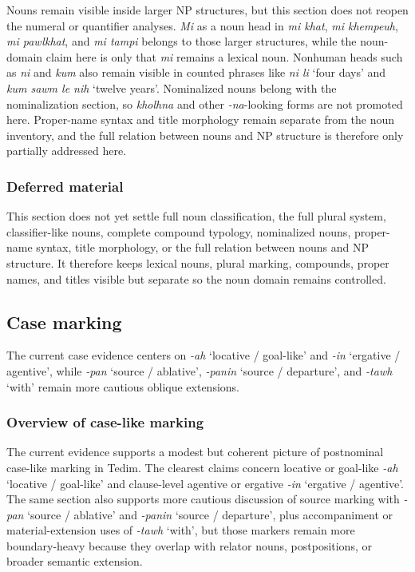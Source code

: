 \documentclass[
  11pt,
  a4paper,
]{article}
\newcommand{\tdim}[1]{\textit{#1}}
\newcommand{\glossquote}[1]{`#1'}
\begin{document}
Nouns remain visible inside larger NP structures, but this section does
not reopen the numeral or quantifier analyses. \tdim{Mi} as a noun head
in \tdim{mi khat}, \tdim{mi khempeuh}, \tdim{mi pawlkhat}, and
\tdim{mi tampi} belongs to those larger structures, while the
noun-domain claim here is only that \tdim{mi} remains a lexical noun.
Nonhuman heads such as \tdim{ni} and \tdim{kum} also remain visible in
counted phrases like \tdim{ni li} \glossquote{four days} and
\tdim{kum sawm le nih} \glossquote{twelve years}. Nominalized nouns
belong with the nominalization section, so \tdim{kholhna} and other
\tdim{-na}-looking forms are not promoted here. Proper-name syntax and
title morphology remain separate from the noun inventory, and the full
relation between nouns and NP structure is therefore only partially
addressed here.

\subsubsection{Deferred material}\label{deferred-material-3}

This section does not yet settle full noun classification, the full
plural system, classifier-like nouns, complete compound typology,
nominalized nouns, proper-name syntax, title morphology, or the full
relation between nouns and NP structure. It therefore keeps lexical
nouns, plural marking, compounds, proper names, and titles visible but
separate so the noun domain remains controlled.

\subsection{Case marking}\label{case-marking}

The current case evidence centers on \tdim{-ah}
\glossquote{locative / goal-like} and \tdim{-in}
\glossquote{ergative / agentive}, while \tdim{-pan}
\glossquote{source / ablative}, \tdim{-panin}
\glossquote{source / departure}, and \tdim{-tawh} \glossquote{with}
remain more cautious oblique extensions.

\subsubsection{Overview of case-like
marking}\label{overview-of-case-like-marking}

The current evidence supports a modest but coherent picture of
postnominal case-like marking in Tedim. The clearest claims concern
locative or goal-like \tdim{-ah} \glossquote{locative / goal-like} and
clause-level agentive or ergative \tdim{-in}
\glossquote{ergative / agentive}. The same section also supports more
cautious discussion of source marking with \tdim{-pan}
\glossquote{source / ablative} and \tdim{-panin}
\glossquote{source / departure}, plus accompaniment or
material-extension uses of \tdim{-tawh} \glossquote{with}, but those
markers remain more boundary-heavy because they overlap with relator
nouns, postpositions, or broader semantic extension.
\end{document}
